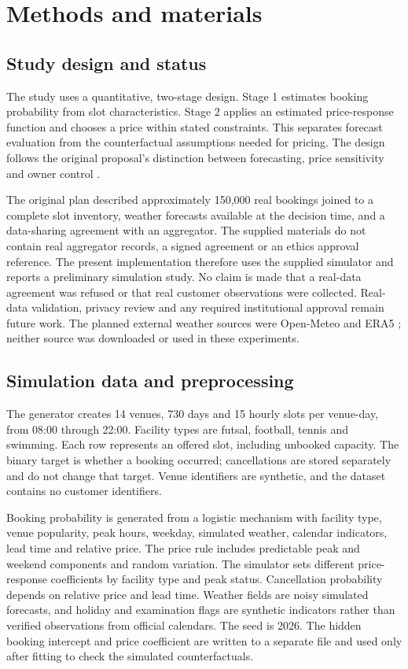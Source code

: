 \section{Methods and materials}
\label{sec:methods}
\subsection{Study design and status}
The study uses a quantitative, two-stage design. Stage 1 estimates booking probability from slot characteristics. Stage 2 applies an estimated price-response function and chooses a price within stated constraints. This separates forecast evaluation from the counterfactual assumptions needed for pricing. The design follows the original proposal's distinction between forecasting, price sensitivity and owner control \cite{r11,r12,r15}.

The original plan described approximately 150,000 real bookings joined to a complete slot inventory, weather forecasts available at the decision time, and a data-sharing agreement with an aggregator. The supplied materials do not contain real aggregator records, a signed agreement or an ethics approval reference. The present implementation therefore uses the supplied simulator and reports a preliminary simulation study. No claim is made that a real-data agreement was refused or that real customer observations were collected. Real-data validation, privacy review and any required institutional approval remain future work. The planned external weather sources were Open-Meteo and ERA5 \cite{m18,m19}; neither source was downloaded or used in these experiments.

\subsection{Simulation data and preprocessing}
The generator creates 14 venues, 730 days and 15 hourly slots per venue-day, from 08:00 through 22:00. Facility types are futsal, football, tennis and swimming. Each row represents an offered slot, including unbooked capacity. The binary target is whether a booking occurred; cancellations are stored separately and do not change that target. Venue identifiers are synthetic, and the dataset contains no customer identifiers.

Booking probability is generated from a logistic mechanism with facility type, venue popularity, peak hours, weekday, simulated weather, calendar indicators, lead time and relative price. The price rule includes predictable peak and weekend components and random variation. The simulator sets different price-response coefficients by facility type and peak status. Cancellation probability depends on relative price and lead time. Weather fields are noisy simulated forecasts, and holiday and examination flags are synthetic indicators rather than verified observations from official calendars. The seed is 2026. The hidden booking intercept and price coefficient are written to a separate file and used only after fitting to check the simulated counterfactuals.

